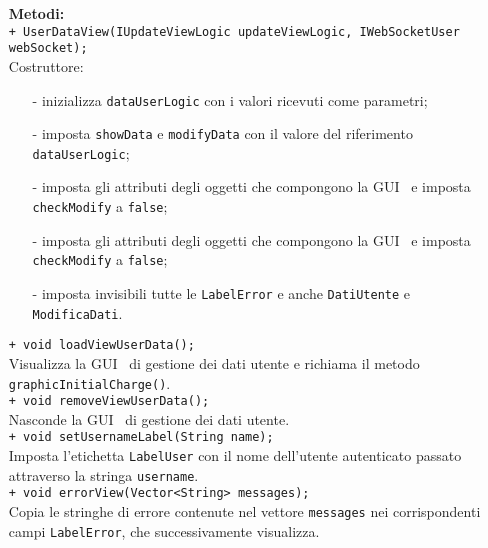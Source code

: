 {\begin{sloppypar}
{{\begin{itemize}
				\texttt{@UiField PushButton ButtonIndietroSubmit;}\\
				Bottone per passare al \texttt{CaptionPanel} \texttt{DatiUtente}.\\

			\item[] \textbf{Metodi:}\\
				\texttt{+ UserDataView(IUpdateViewLogic updateViewLogic, IWebSocketUser webSocket);}\\
				Costruttore:
				\begin{itemize}
					\item[-] inizializza \texttt{dataUserLogic} con i valori ricevuti come parametri;
					\item[-] imposta \texttt{showData} e \texttt{modifyData} con il valore del riferimento \texttt{dataUserLogic};
					\item[-] imposta gli attributi degli oggetti che compongono la GUI\g~ e imposta \texttt{checkModify} a \texttt{false};
					\item[-] imposta gli attributi degli oggetti che compongono la GUI\g~ e imposta \texttt{checkModify} a \texttt{false}; 
					\item[-] imposta invisibili tutte le \texttt{LabelError} e anche \texttt{DatiUtente} e \texttt{ModificaDati}.\\
				\end{itemize}
				
				\texttt{+ void loadViewUserData();}\\
				Visualizza la GUI\g~ di gestione dei dati utente e richiama il metodo \texttt{graphicInitialCharge()}.\\
				
				\texttt{+ void removeViewUserData();}\\
				Nasconde la GUI\g~ di gestione dei dati utente.\\
				
				\texttt{+ void setUsernameLabel(String name);}\\
				Imposta l'etichetta \texttt{LabelUser} con il nome dell'utente autenticato passato attraverso la stringa \texttt{username}.\\
				
				\texttt{+ void errorView(Vector<String> messages);}\\
				Copia le stringhe di errore contenute nel vettore \texttt{messages} nei corrispondenti campi \texttt{LabelError}, che successivamente visualizza.\\
				

\end{itemize}}}
\end{sloppypar}}
